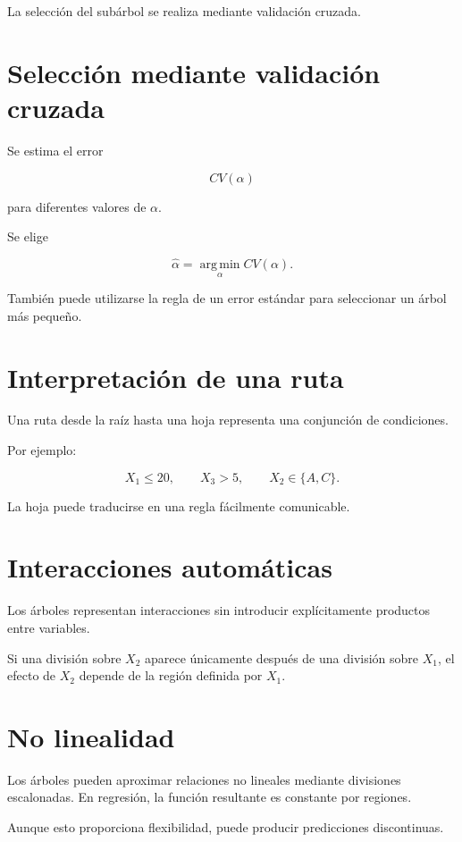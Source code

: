 \documentclass[
  spanish,
  11pt,
  letterpaper,
  DIV=11,
  numbers=noendperiod]{scrreprt}
\theoremstyle{definition}
\theoremstyle{plain}
\theoremstyle{definition}
\theoremstyle{remark}
\begin{document}
La selección del subárbol se realiza mediante validación cruzada.

\section{Selección mediante validación
cruzada}\label{selecciuxf3n-mediante-validaciuxf3n-cruzada}

Se estima el error

\[
CV(\alpha)
\]

para diferentes valores de \(\alpha\).

Se elige

\[
\widehat{\alpha}
=
\operatorname*{arg\,min}_{\alpha}CV(\alpha).
\]

También puede utilizarse la regla de un error estándar para seleccionar
un árbol más pequeño.

\section{Interpretación de una
ruta}\label{interpretaciuxf3n-de-una-ruta}

Una ruta desde la raíz hasta una hoja representa una conjunción de
condiciones.

Por ejemplo:

\[
X_1\leq 20,
\qquad
X_3>5,
\qquad
X_2\in\{A,C\}.
\]

La hoja puede traducirse en una regla fácilmente comunicable.

\section{Interacciones automáticas}\label{interacciones-automuxe1ticas}

Los árboles representan interacciones sin introducir explícitamente
productos entre variables.

Si una división sobre \(X_2\) aparece únicamente después de una división
sobre \(X_1\), el efecto de \(X_2\) depende de la región definida por
\(X_1\).

\section{No linealidad}\label{no-linealidad}

Los árboles pueden aproximar relaciones no lineales mediante divisiones
escalonadas. En regresión, la función resultante es constante por
regiones.

Aunque esto proporciona flexibilidad, puede producir predicciones
discontinuas.
\end{document}
